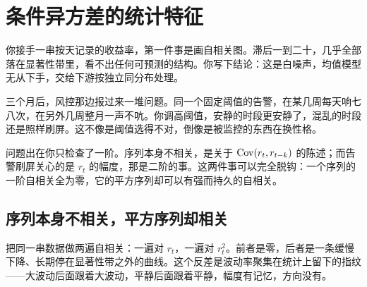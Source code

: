 \section{条件异方差的统计特征}
\label{sec:11-Mathematical-Statistics/10-GARCH-and-Volatility/01}

你接手一串按天记录的收益率，第一件事是画自相关图。滞后一到二十，几乎全部落在显著性带里，看不出任何可预测的结构。你写下结论：这是白噪声，均值模型无从下手，交给下游按独立同分布处理。

三个月后，风控那边报过来一堆问题。同一个固定阈值的告警，在某几周每天响七八次，在另外几周整月一声不吭。你调高阈值，安静的时段更安静了，混乱的时段还是照样刷屏。这不像是阈值选得不对，倒像是被监控的东西在换性格。

问题出在你只检查了一阶。序列本身不相关，是关于 \(\operatorname{Cov}(r_t,r_{t-k})\) 的陈述；而告警刷屏关心的是 \(r_t\) 的幅度，那是二阶的事。这两件事可以完全脱钩：一个序列的一阶自相关全为零，它的平方序列却可以有强而持久的自相关。

\subsection{序列本身不相关，平方序列却相关}

把同一串数据做两遍自相关：一遍对 \(r_t\)，一遍对 \(r_t^2\)。前者是零，后者是一条缓慢下降、长期停在显著性带之外的曲线。这个反差是波动率聚集在统计上留下的指纹——大波动后面跟着大波动，平静后面跟着平静，幅度有记忆，方向没有。

